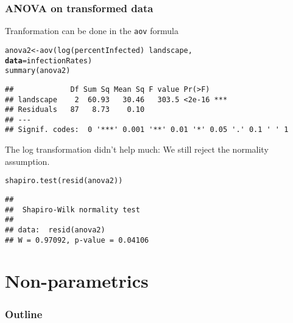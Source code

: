 \documentclass[color=usenames,dvipsnames]{beamer}\usepackage[]{graphicx}\usepackage[]{color}
\makeatletter
\newcommand{\hlopt}[1]{\textcolor[rgb]{0,0,0}{#1}}%
\newcommand{\hlstd}[1]{\textcolor[rgb]{0,0,0}{#1}}%
\newcommand{\hlkwb}[1]{\textcolor[rgb]{0,0.341,0.682}{#1}}%
\newcommand{\hlkwc}[1]{\textcolor[rgb]{0,0,0}{\textbf{#1}}}%
\newcommand{\hlkwd}[1]{\textcolor[rgb]{0.004,0.004,0.506}{#1}}%
\newenvironment{kframe}{%
 \def\at@end@of@kframe{}%
 \ifinner\ifhmode%
  \def\at@end@of@kframe{\end{minipage}}%
  \begin{minipage}{\columnwidth}%
 \fi\fi%
 \def\FrameCommand##1{\hskip\@totalleftmargin \hskip-\fboxsep
 \colorbox{shadecolor}{##1}\hskip-\fboxsep
     \hskip-\linewidth \hskip-\@totalleftmargin \hskip\columnwidth}%
 \MakeFramed {\advance\hsize-\width
   \@totalleftmargin\z@ \linewidth\hsize
   \@setminipage}}%
 {\par\unskip\endMakeFramed%
 \at@end@of@kframe}
\newenvironment{knitrout}{}{} %
\newcommand{\inr}[1]{\colorbox{inlinecolor}{\texttt{#1}}}
\makeatother
\begin{document}
\begin{frame}[fragile]
  \frametitle{ANOVA on transformed data}
  \small
  {Tranformation can be done in the \inr{aov} formula}
\begin{knitrout}\footnotesize
{}\color{fgcolor}\begin{kframe}
\begin{alltt}
\hlstd{anova2} \hlkwb{<-} \hlkwd{aov}\hlstd{(}\hlkwd{log}\hlstd{(percentInfected)}\hlopt{~}\hlstd{landscape,}
              \hlkwc{data}\hlstd{=infectionRates)}
\hlkwd{summary}\hlstd{(anova2)}
\end{alltt}
\begin{verbatim}
##             Df Sum Sq Mean Sq F value Pr(>F)    
## landscape    2  60.93   30.46   303.5 <2e-16 ***
## Residuals   87   8.73    0.10                   
## ---
## Signif. codes:  0 '***' 0.001 '**' 0.01 '*' 0.05 '.' 0.1 ' ' 1
\end{verbatim}
\end{kframe}
\end{knitrout}
  \pause
  \vfill
  {The log transformation didn't help much: We still reject the
    normality assumption.} 
\begin{knitrout}\footnotesize
{}\color{fgcolor}\begin{kframe}
\begin{alltt}
\hlkwd{shapiro.test}\hlstd{(}\hlkwd{resid}\hlstd{(anova2))}
\end{alltt}
\begin{verbatim}
## 
## 	Shapiro-Wilk normality test
## 
## data:  resid(anova2)
## W = 0.97092, p-value = 0.04106
\end{verbatim}
\end{kframe}
\end{knitrout}
\end{frame}




\section{Non-parametrics}




\begin{frame}[plain]
 \frametitle{Outline}
 \Large
 \tableofcontents[currentsection]
\end{frame}
\end{document}
